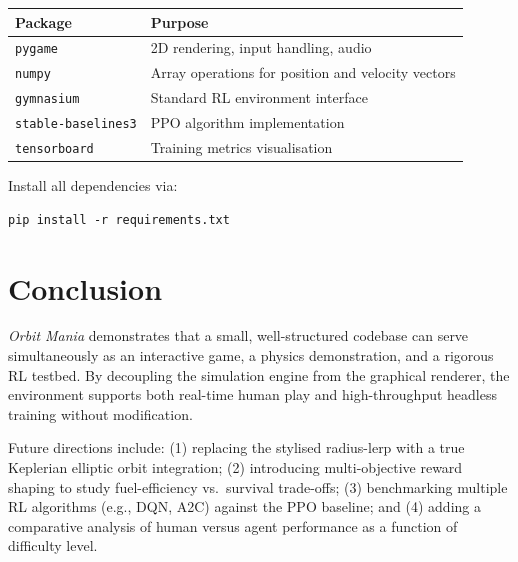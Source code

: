 \documentclass[12pt]{article}
\begin{document}
\begin{center}
    \renewcommand{\arraystretch}{1.3}
    \begin{tabular}{ll}
        \toprule
        Package                    & Purpose                                            \\
        \midrule
        \texttt{pygame}            & 2D rendering, input handling, audio                \\
        \texttt{numpy}             & Array operations for position and velocity vectors \\
        \texttt{gymnasium}         & Standard RL environment interface                  \\
        \texttt{stable-baselines3} & PPO algorithm implementation                       \\
        \texttt{tensorboard}       & Training metrics visualisation                     \\
        \bottomrule
    \end{tabular}
\end{center}

Install all dependencies via:
\begin{lstlisting}[style=python, caption={Installing project dependencies.}]
pip install -r requirements.txt
\end{lstlisting}

\section{Conclusion}

\textit{Orbit Mania} demonstrates that a small, well-structured codebase can serve simultaneously as an interactive game, a physics demonstration, and a rigorous RL testbed. By decoupling the simulation engine from the graphical renderer, the environment supports both real-time human play and high-throughput headless training without modification.

Future directions include: (1) replacing the stylised radius-lerp with a true Keplerian elliptic orbit integration; (2) introducing multi-objective reward shaping to study fuel-efficiency vs.\ survival trade-offs; (3) benchmarking multiple RL algorithms (e.g., DQN, A2C) against the PPO baseline; and (4) adding a comparative analysis of human versus agent performance as a function of difficulty level.
\end{document}
